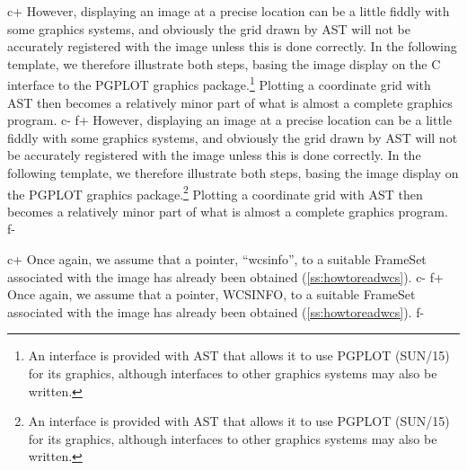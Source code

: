 \documentclass[twoside,11pt]{article}
\newcommand{\xref}[3]{#1}
\newcommand{\secref}[1]{\S\ref{#1}}
\renewcommand{\secref}[1]{\ref{#1}}
\begin{document}
c+
However, displaying an image at a precise location can be a little
fiddly with some graphics systems, and obviously the grid drawn by AST
will not be accurately registered with the image unless this is done
correctly. In the following template, we therefore illustrate both
steps, basing the image display on the C interface to the PGPLOT
graphics package.\footnote{An interface is provided with AST that
allows it to use PGPLOT (\xref{SUN/15}{sun15}{}) for its graphics,
although interfaces to other graphics systems may also be written.}
Plotting a coordinate grid with AST then becomes a relatively minor
part of what is almost a complete graphics program.
c-
f+
However, displaying an image at a precise location can be a little
fiddly with some graphics systems, and obviously the grid drawn by AST
will not be accurately registered with the image unless this is done
correctly. In the following template, we therefore illustrate both
steps, basing the image display on the PGPLOT graphics
package.\footnote{An interface is provided with AST that allows it to
use PGPLOT (\xref{SUN/15}{sun15}{}) for its graphics, although
interfaces to other graphics systems may also be written.}  Plotting a
coordinate grid with AST then becomes a relatively minor part of what
is almost a complete graphics program.
f-

c+
Once again, we assume that a pointer, ``wcsinfo'', to a suitable
FrameSet associated with the image has already been obtained
(\secref{ss:howtoreadwcs}).
c-
f+
Once again, we assume that a pointer, WCSINFO, to a suitable FrameSet
associated with the image has already been obtained
(\secref{ss:howtoreadwcs}).
f-
\end{document}
